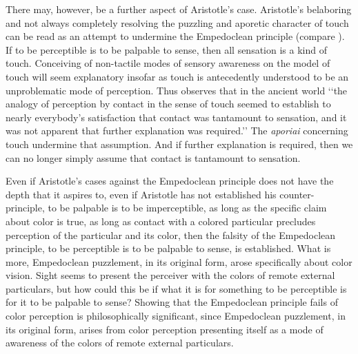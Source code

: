 There may, however, be a further aspect of Aristotle's case. Aristotle's belaboring and not always completely resolving the puzzling and aporetic character of touch can be read as an attempt to undermine the Empedoclean principle (compare \citealt[``When our eyes touch \ldots'']{Derrida:2005aa}). If to be perceptible is to be palpable to sense, then all sensation is a kind of touch. Conceiving of non-tactile modes of sensory awareness on the model of touch will seem explanatory insofar as touch is antecedently understood to be an unproblematic mode of perception. Thus \citet[39]{Lindberg:1977aa} observes that in the ancient world ‘‘the analogy of perception by contact in the sense of touch seemed to establish to nearly everybody’s satisfaction that contact was tantamount to sensation, and it was not apparent that further explanation was required.’’ The \emph{aporiai} concerning touch undermine that assumption. And if further explanation is required, then we can no longer simply assume that contact is tantamount to sensation.

Even if Aristotle's cases against the Empedoclean principle does not have the depth that it aspires to, even if Aristotle has not established his counter-principle, to be palpable is to be imperceptible, as long as the specific claim about color is true, as long as contact with a colored particular precludes perception of the particular and its color, then the falsity of the Empedoclean principle, to be perceptible is to be palpable to sense, is established. What is more, Empedoclean puzzlement, in its original form, arose specifically about color vision. Sight seems to present the perceiver with the colors of remote external particulars, but how could this be if what it is for something to be perceptible is for it to be palpable to sense? Showing that the Empedoclean principle fails of color perception is philosophically significant, since Empedoclean puzzlement, in its original form, arises from color perception presenting itself as a mode of awareness of the colors of remote external particulars. 

